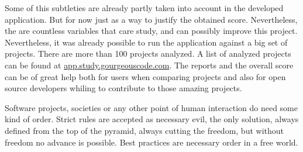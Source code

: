 Some of this subtleties are already partly taken into account in the developed application.
But for now just as a way to justify the obtained score. 
Nevertheless, the are countless variables that care study, and can possibly improve this project.
Nevertheless, it was already possible to run the application against a big set of projects.
There are more than 100 projects analyzed.
A list of analyzed projects can be found at \url{app.study.gourgeouscode.com}.
The reports and the overall score can be of great help both for users when comparing projects and 
also for open source developers whiling to contribute to those amazing projects.

Software projects, societies or any other point of human interaction do need some kind of order.
Strict rules are accepted as necessary evil, the only solution, always defined from the top of the pyramid,
always cutting the freedom, but without freedom no advance is possible.
Best practices are necessary order in a free world.
